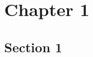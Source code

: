 \chapter{Chapter 1}
\label{chap:chapter1}
\chapterstart

\section{Section 1}\label{sec:section_1_1}



\chapterend

